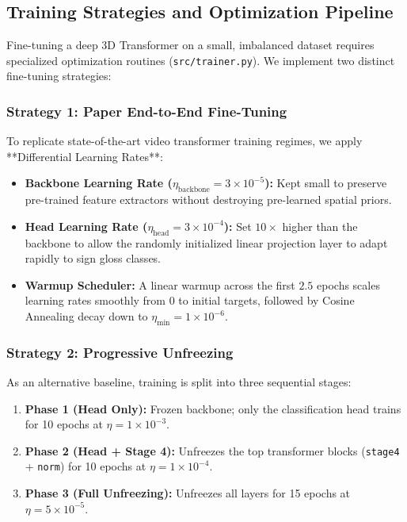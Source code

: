 \documentclass[12pt,a4paper]{article}
\begin{document}
\subsection{Training Strategies and Optimization Pipeline}

Fine-tuning a deep 3D Transformer on a small, imbalanced dataset requires specialized optimization routines (\texttt{src/trainer.py}). We implement two distinct fine-tuning strategies:

\subsubsection{Strategy 1: Paper End-to-End Fine-Tuning}
To replicate state-of-the-art video transformer training regimes, we apply **Differential Learning Rates**:
\begin{itemize}
    \item \textbf{Backbone Learning Rate ($\eta_{\text{backbone}} = 3 \times 10^{-5}$):} Kept small to preserve pre-trained feature extractors without destroying pre-learned spatial priors.
    \item \textbf{Head Learning Rate ($\eta_{\text{head}} = 3 \times 10^{-4}$):} Set $10\times$ higher than the backbone to allow the randomly initialized linear projection layer to adapt rapidly to sign gloss classes.
    \item \textbf{Warmup Scheduler:} A linear warmup across the first $2.5$ epochs scales learning rates smoothly from $0$ to initial targets, followed by Cosine Annealing decay down to $\eta_{\text{min}} = 1 \times 10^{-6}$.
\end{itemize}

\subsubsection{Strategy 2: Progressive Unfreezing}
As an alternative baseline, training is split into three sequential stages:
\begin{enumerate}
    \item \textbf{Phase 1 (Head Only):} Frozen backbone; only the classification head trains for 10 epochs at $\eta = 1 \times 10^{-3}$.
    \item \textbf{Phase 2 (Head + Stage 4):} Unfreezes the top transformer blocks (\texttt{stage4} + \texttt{norm}) for 10 epochs at $\eta = 1 \times 10^{-4}$.
    \item \textbf{Phase 3 (Full Unfreezing):} Unfreezes all layers for 15 epochs at $\eta = 5 \times 10^{-5}$.
\end{enumerate}
\end{document}
